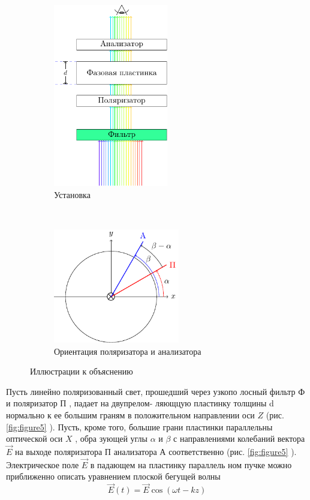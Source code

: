 \begin{figure}[t!]
    \centering
    \begin{subfigure}[c]{0.5\textwidth}
        \centering
        \includegraphics[height=8cm]{ris/ris1.pdf}
        \caption{Установка}
    \end{subfigure}%
    ~ 
    \begin{subfigure}[c]{0.5\textwidth}
        \centering
        \includegraphics[height=5cm]{ris/ris1b}
        \caption{Ориентация поляризатора и анализатора}
    \end{subfigure}
    \caption{Иллюстрации к объяснению}

\end{figure} 

Пусть линейно поляризованный свет, прошедший через узкопо­
лосный фильтр $\text{Ф}$ и поляризатор $\text{П}$ , падает на двупрелом-
ляющцую пластинку толщины d нормально к ее большим граням в
положительном направлении оси $Z$ (рис.\ref{fig:figure5} ). Пусть, кроме того,
большие грани пластинки параллельны оптической оси $X$ , обра­
зующей углы $\alpha$ и $\beta$ с направлениями колебаний вектора $\vec{E}$
на выходе поляризатора П анализатора А соответственно
(рис. \ref{fig:figure5} ). Электрическое поле $\vec{E}$ в падающем на пластинку параллель­
ном пучке можно приближенно описать уравнением плоской бегущей
волны 
\begin{equation}
	\vec{E}(t)=\vec{E}\cos(\omega t-kz)
\end{equation}



